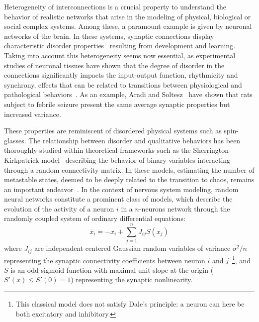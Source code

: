 Heterogeneity of interconnections is a crucial property to understand the behavior of realistic networks that arise in the modeling of physical, biological or social complex systems. Among these, a paramount example is given by neuronal networks of the brain. In these systems, synaptic connections display characteristic disorder properties~\cite{parker:03,marder-goaillard:06} resulting from development and learning. 
Taking into account this heterogeneity seems now essential, as experimental studies of neuronal tissues have shown that the degree of disorder in the connections significantly impacts the input-output function, rhythmicity and synchrony, effects that can be related to transitions between physiological and pathological behaviors~\cite{aradi-soltesz:02,santhakumar2004plasticity,soltesz2005diversity}. As an example, Aradi and Soltesz~\cite{aradi-soltesz:02} have shown that rats subject to febrile seizure present the same average synaptic properties but increased variance. 

These properties are reminiscent of disordered physical systems such as spin-glasses. The relationship between disorder and qualitative behaviors has been thoroughly studied within theoretical frameworks such as the Sherrington-Kirkpatrick model~\cite{sherrington-kirkpatrick:75} describing the behavior of binary variables interacting through a random connectivity matrix. In these models, estimating the number of metastable states, deemed to be deeply related to the transition to chaos, remains an important endeavor~\cite{parisi2006course}. In the context of nervous system modeling, random neural networks \cite{sompolinsky-crisanti-etal:88, amari:72} constitute a prominent class of models, which describe the evolution of the activity of a neuron $i$ in a $n$-neurons network through the randomly coupled system of ordinary differential equations: 
\begin{equation}
	\label{eq:sompo}
	\dot{x_i} = -x_i + \sum_{j=1}^n J_{ij}S(x_j)
\end{equation}
where $J_{ij}$ are independent centered Gaussian random variables of variance $\sigma^2/n$ representing the synaptic connectivity coefficients between neuron $i$ and $j$~\footnote{{This classical model does not satisfy Dale's principle: a neuron can here be both excitatory and inhibitory.}}, and $S$ is an odd sigmoid function with maximal unit slope at the origin ($S'(x)\leq S'(0)=1$) representing the synaptic nonlinearity. 

